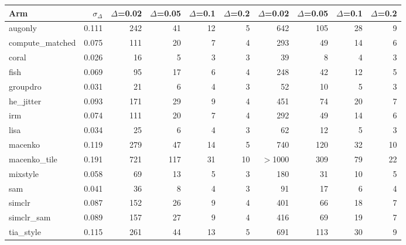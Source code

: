\begin{tabular}{lrrrrrrrrr}
\toprule
Arm & $\sigma_\Delta$ & $\Delta$=0.02 & $\Delta$=0.05 & $\Delta$=0.1 & $\Delta$=0.2 & $\Delta$=0.02 & $\Delta$=0.05 & $\Delta$=0.1 & $\Delta$=0.2 \\
\midrule
augonly & 0.111 & 242 & 41 & 12 & 5 & 642 & 105 & 28 & 9 \\
compute\_matched & 0.075 & 111 & 20 & 7 & 4 & 293 & 49 & 14 & 6 \\
coral & 0.026 & 16 & 5 & 3 & 3 & 39 & 8 & 4 & 3 \\
fish & 0.069 & 95 & 17 & 6 & 4 & 248 & 42 & 12 & 5 \\
groupdro & 0.031 & 21 & 6 & 4 & 3 & 52 & 10 & 5 & 3 \\
he\_jitter & 0.093 & 171 & 29 & 9 & 4 & 451 & 74 & 20 & 7 \\
irm & 0.074 & 111 & 20 & 7 & 4 & 292 & 49 & 14 & 6 \\
lisa & 0.034 & 25 & 6 & 4 & 3 & 62 & 12 & 5 & 3 \\
macenko & 0.119 & 279 & 47 & 14 & 5 & 740 & 120 & 32 & 10 \\
macenko\_tile & 0.191 & 721 & 117 & 31 & 10 & $>$1000 & 309 & 79 & 22 \\
mixstyle & 0.058 & 69 & 13 & 5 & 3 & 180 & 31 & 10 & 5 \\
sam & 0.041 & 36 & 8 & 4 & 3 & 91 & 17 & 6 & 4 \\
simclr & 0.087 & 152 & 26 & 9 & 4 & 401 & 66 & 18 & 7 \\
simclr\_sam & 0.089 & 157 & 27 & 9 & 4 & 416 & 69 & 19 & 7 \\
tia\_style & 0.115 & 261 & 44 & 13 & 5 & 691 & 113 & 30 & 9 \\
\bottomrule
\end{tabular}
